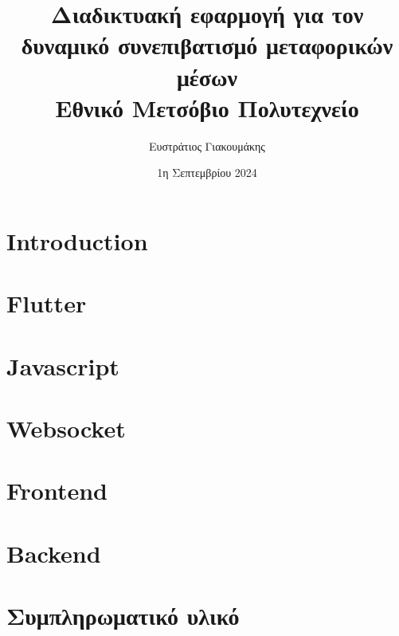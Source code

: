 \documentclass{report}
\title{
    {Διαδικτυακή εφαρμογή για τον δυναμικό συνεπιβατισμό μεταφορικών μέσων}\\
    {\large Εθνικό Μετσόβιο Πολυτεχνείο}
}
\author{Ευστράτιος Γιακουμάκης}
\date{1η Σεπτεμβρίου 2024}
\begin{document}
\maketitle

\tableofcontents

\chapter{Introduction}

\chapter{Flutter}


\chapter{Javascript}


\chapter{Websocket}

\chapter{Frontend}


\chapter{Backend}


\appendix
\chapter{Συμπληρωματικό υλικό}


\printbibliography
\end{document}
